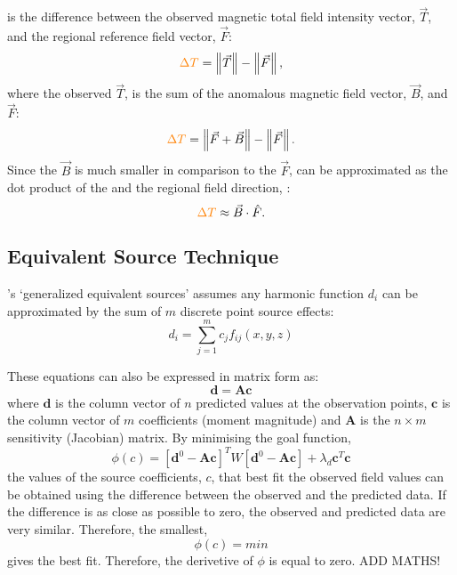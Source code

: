 is the difference between the observed magnetic total field intensity vector, $\vec{T}$, and the regional reference field vector, $\vec{F}$:
\begin{equation}
    \textcolor{orange}{\Delta T} = \left\lVert \vec{T} \right\rVert - \left\lVert \vec{F} \right\rVert,
\end{equation}
where the observed $\vec{T}$, is the sum of the anomalous magnetic field vector, $\vec{B}$, and $\vec{F}$:
\begin{equation}
    \textcolor{orange}{\Delta T} = \left\lVert \vec{F} + \vec{B} \right\rVert - \left\lVert \vec{F} \right\rVert.
\end{equation}
Since the $\vec{B}$ is much smaller in comparison to the $\vec{F}$, \deltaT can be approximated as the dot product of the  and the regional field direction, :
\begin{equation}
    \textcolor{orange}{\Delta T} \approx  \vec{B} \cdot \hat{F}.
\end{equation}

\subsection{Equivalent Source Technique}
\cite{Cordell1992}'s ‘generalized equivalent sources’ assumes any harmonic function $d_i$ can be approximated by the sum of $m$ discrete point source effects:
\begin{equation}
d_i = \sum_{j=1}^{m} c_j f_{ij}(x,y,z)
\end{equation}

These equations can also be expressed in matrix form as:
\begin{equation}
    \mathbf{d} = \mathbf{Ac}
\end{equation}
where $\mathbf{d}$ is the column vector of $n$ predicted values at the observation points, $\mathbf{c}$ is the column vector of $m$ coefficients (moment magnitude) and $\mathbf{A}$ is the $n \times m$ sensitivity (Jacobian) matrix. By minimising the goal function,
\begin{equation}
    \phi(c) = [\mathbf{d}^0 - \mathbf{Ac}]^T W[\mathbf{d}^0 - \mathbf{Ac}] + \lambda_d \mathbf{c}^T\mathbf{c}
\end{equation}
the values of the source coefficients, $c$, that best fit the observed field values can be obtained using the difference between the observed and the predicted data. If the difference is as close as possible to zero, the observed and predicted data are very similar. Therefore, the smallest,
\begin{equation}
    \phi(c) = min
\end{equation}
gives the best fit. Therefore, the derivetive of $\phi$ is equal to zero.
ADD MATHS!

